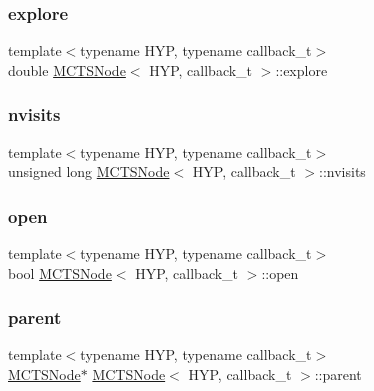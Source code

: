 \subsubsection{\texorpdfstring{explore}{explore}}
{\footnotesize\ttfamily template$<$typename H\+YP, typename callback\+\_\+t$>$ \\
double \hyperlink{class_m_c_t_s_node}{M\+C\+T\+S\+Node}$<$ H\+YP, callback\+\_\+t $>$\+::explore}

\mbox{\label{class_m_c_t_s_node_afe230ccb2748cb60328c7e9bbfdfc0a2}} 
\subsubsection{\texorpdfstring{nvisits}{nvisits}}
{\footnotesize\ttfamily template$<$typename H\+YP, typename callback\+\_\+t$>$ \\
unsigned long \hyperlink{class_m_c_t_s_node}{M\+C\+T\+S\+Node}$<$ H\+YP, callback\+\_\+t $>$\+::nvisits}

\mbox{\label{class_m_c_t_s_node_a406077cff81145c885ee395cd8553744}} 
\subsubsection{\texorpdfstring{open}{open}}
{\footnotesize\ttfamily template$<$typename H\+YP, typename callback\+\_\+t$>$ \\
bool \hyperlink{class_m_c_t_s_node}{M\+C\+T\+S\+Node}$<$ H\+YP, callback\+\_\+t $>$\+::open}

\mbox{\label{class_m_c_t_s_node_afd7d3f1262b41d10b42a5721ac95af68}} 
\subsubsection{\texorpdfstring{parent}{parent}}
{\footnotesize\ttfamily template$<$typename H\+YP, typename callback\+\_\+t$>$ \\
\hyperlink{class_m_c_t_s_node}{M\+C\+T\+S\+Node}$\ast$ \hyperlink{class_m_c_t_s_node}{M\+C\+T\+S\+Node}$<$ H\+YP, callback\+\_\+t $>$\+::parent}

